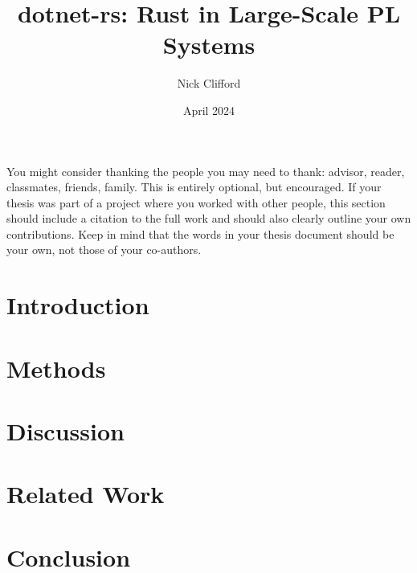 \documentclass{ucetd}
\title{dotnet-rs: Rust in Large-Scale PL Systems}
\author{Nick Clifford}
\date{April 2024}
\begin{document}
\maketitle

\makecopyright


\tableofcontents

\acknowledgments
You might consider thanking the people you may need to thank: advisor, reader, classmates, friends, family. This is entirely optional, but encouraged. If your thesis was part of a project where you worked with other people, this section should include a citation to the full work and should also clearly outline your own contributions. Keep in mind that the words in your thesis document should be your own, not those of your co-authors.

\abstract


\mainmatter

\chapter{Introduction}


\chapter{Methods}


\chapter{Discussion}


\chapter{Related Work}


\chapter{Conclusion}


\makebibliography

%
%

%
%
\end{document}

